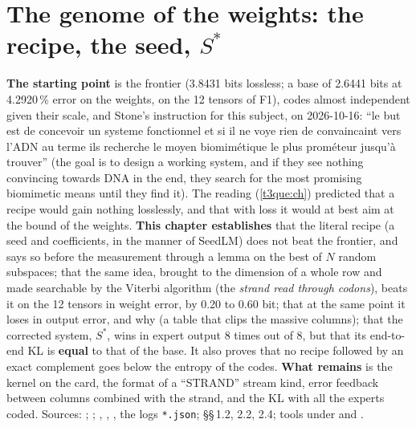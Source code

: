 \chapter{The genome of the weights: the recipe, the seed, \texorpdfstring{$S^{*}$}{S*}}\label{t3gen:ch}

\begin{origine}
\textbf{The starting point} is the frontier (3.8431 bits lossless; a base of 2.6441 bits at 4.2920\,\% error on the weights, on the 12 tensors of F1), codes almost independent given their scale, and Stone's instruction for this subject, on 2026-10-16: ``le but est de concevoir un systeme fonctionnel et si il ne voye rien de convaincaint vers l'ADN au terme ils recherche le moyen biomimétique le plus prométeur jusqu'à trouver'' (the goal is to design a working system, and if they see nothing convincing towards DNA in the end, they search for the most promising biomimetic means until they find it). The reading (\cref{t3que:ch}) predicted that a recipe would gain nothing losslessly, and that with loss it would at best aim at the bound of the weights.
\textbf{This chapter establishes} that the literal recipe (a seed and coefficients, in the manner of SeedLM) does not beat the frontier, and says so before the measurement through a lemma on the best of $N$ random subspaces; that the same idea, brought to the dimension of a whole row and made searchable by the Viterbi algorithm (the \emph{strand read through codons}), beats it on the 12 tensors in weight error, by 0.20 to 0.60 bit; that at the same point it loses in output error, and why (a table that clips the massive columns); that the corrected system, $S^{*}$, wins in expert output 8 times out of 8, but that its end-to-end KL is \textbf{equal} to that of the base. It also proves that no recipe followed by an exact complement goes below the entropy of the codes.
\textbf{What remains} is the kernel on the card, the format of a ``STRAND'' stream kind, error feedback between columns combined with the strand, and the KL with all the experts coded.
Sources: ; ; , , , the logs \texttt{*.json};  §§\,1.2, 2.2, 2.4; tools under  and .
\end{origine}

